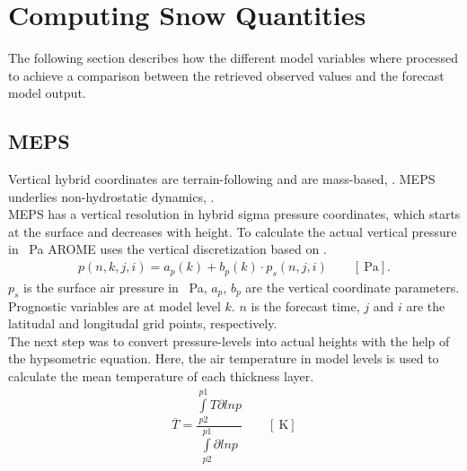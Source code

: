 \section{Computing Snow Quantities} \label{sec:data_proc}
The following section describes how the different model variables where processed to achieve a comparison between the retrieved observed values and the forecast model output. 

\subsection{MEPS}\label{sec:layer_thickness}
Vertical hybrid coordinates are terrain-following and are mass-based, \citep{muller_arome-metcoop:_2017}. %
MEPS underlies non-hydrostatic dynamics, \cite{metcoop_wiki_description_2017}.
\\
MEPS has a vertical resolution in hybrid sigma pressure coordinates, which starts at the surface and decreases with height. To calculate the actual vertical pressure in \SI{}{\Pa} AROME uses the vertical discretization based on \citet{simmons_energy_1981}. %
\begin{align}
	p(n,k,j,i) = a_p(k) + b_p(k) \cdot p_s(n,j,i) \qquad [\SI{}{\Pa}].
	\label{eq:hybrid_sigma_pressure}
\end{align}
$p_s$ is the surface air pressure in \SI{}{\Pa}, $a_p$, $b_p$ are the vertical coordinate parameters. Prognostic variables are at model level $k$. $n$ is the forecast time, $j$ and $i$ are the latitudal and longitudal grid points, respectively.
\\
The next step was to convert pressure-levels into actual heights with the help of the hypsometric equation. Here, the air temperature in model levels is used to calculate the mean temperature of each thickness layer. 
\begin{align}
	\overline{T} = \dfrac{\int\limits_{p2}^{p1} T \partial ln p}{\int\limits_{p2}^{p1}\partial ln p} \qquad [\SI{}{\kelvin}]
	\label{eq:T_avg}
\end{align}
